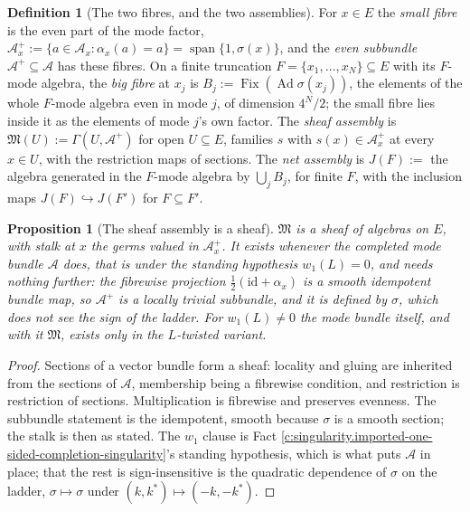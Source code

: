 \documentclass[11pt]{article}
\newtheorem{proposition}[theorem]{Proposition}
\theoremstyle{definition}
\newtheorem{definition}[theorem]{Definition}
\theoremstyle{plain}
\providecommand{\Aa}{}\renewcommand{\Aa}{\mathcal{A}}
\providecommand{\id}{}\renewcommand{\id}{\mathrm{id}}
\providecommand{\shL}{}\renewcommand{\shL}{L}
\begin{document}
\begin{definition}[The two fibres, and the two assemblies]\label{c:obj.singularity.two-fibres-two-assemblies}
For $x \in E$ the \emph{small fibre} is the even part of the mode factor, $\Aa_x^{+} := \{a \in \Aa_x : \alpha_x(a) = a\} = \operatorname{span}\{1, \sigma(x)\}$, and the \emph{even subbundle} $\Aa^{+} \subseteq \Aa$ has these fibres. On a finite truncation $F = \{x_1, \dots, x_N\} \subseteq E$ with its $F$-mode algebra, the \emph{big fibre} at $x_j$ is $B_j := \operatorname{Fix}(\operatorname{Ad}\sigma(x_j))$, the elements of the whole $F$-mode algebra even in mode $j$, of dimension $4^N/2$; the small fibre lies inside it as the elements of mode $j$'s own factor. The \emph{sheaf assembly} is $\mathfrak{M}(U) := \Gamma(U, \Aa^{+})$ for open $U \subseteq E$, families $s$ with $s(x) \in \Aa_x^{+}$ at every $x \in U$, with the restriction maps of sections. The \emph{net assembly} is $J(F) :=$ the algebra generated in the $F$-mode algebra by $\bigcup_j B_j$, for finite $F$, with the inclusion maps $J(F) \hookrightarrow J(F')$ for $F \subseteq F'$.
\end{definition}

\begin{proposition}[The sheaf assembly is a sheaf]\label{c:singularity.sheaf-assembly-sheaf}
$\mathfrak{M}$ is a sheaf of algebras on $E$, with stalk at $x$ the germs valued in $\Aa_x^{+}$. It exists whenever the completed mode bundle $\Aa$ does, that is under the standing hypothesis $w_1(\shL) = 0$, and needs nothing further: the fibrewise projection $\tfrac12(\id + \alpha_x)$ is a smooth idempotent bundle map, so $\Aa^{+}$ is a locally trivial subbundle, and it is defined by $\sigma$, which does not see the sign of the ladder. For $w_1(\shL) \neq 0$ the mode bundle itself, and with it $\mathfrak{M}$, exists only in the $\shL$-twisted variant.
\end{proposition}
\begin{proof}
Sections of a vector bundle form a sheaf: locality and gluing are inherited from the sections of $\Aa$, membership being a fibrewise condition, and restriction is restriction of sections. Multiplication is fibrewise and preserves evenness. The subbundle statement is the idempotent, smooth because $\sigma$ is a smooth section; the stalk is then as stated. The $w_1$ clause is Fact \ref{c:singularity.imported-one-sided-completion-singularity}'s standing hypothesis, which is what puts $\Aa$ in place; that the rest is sign-insensitive is the quadratic dependence of $\sigma$ on the ladder, $\sigma \mapsto \sigma$ under $(k, k^{*}) \mapsto (-k, -k^{*})$.

\end{proof}
\end{document}
